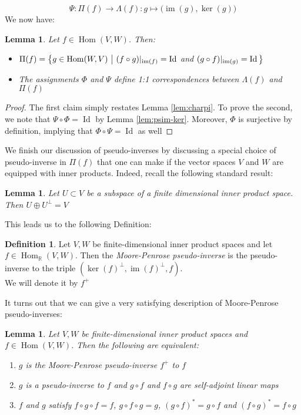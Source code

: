 \documentclass{book}
\theoremstyle{plain}
\newtheorem{lemma}[corollary]{Lemma}
\theoremstyle{definition}
\newtheorem{definition}[corollary]{Definition}
\renewcommand{\d}[1]{\mathbb{#1}}
\newcommand{\ds}{\oplus}
\newcommand{\fun}{\mapsto}
\DeclareMathOperator{\Hom}{Hom}
\DeclareMathOperator{\Id}{Id}
\DeclareMathOperator{\im}{im}
\newcommand{\mor}{\longrightarrow}
\begin{document}
\[
\Psi: \Pi(f)\mor \Lambda(f): g\fun \big(\im(g),\ker(g)\big)
\]
We now have:
\begin{lemma}\label{lem:psinverses}
	Let $f \in \Hom(V,W)$. Then:
	\begin{itemize}
		\item 
		$\Pi(f)=\big\{ g \in \Hom(W,V)\,\,\big\vert\,\, (f\circ g)\arrowvert_{\im(f)}=\Id$ \textrm{ and } $(g\circ f)\arrowvert_{\im(g)}=\Id \big\} $
		\item The assignments $\Phi$ and $\Psi$ define 1:1 correspondences between $\Lambda(f)$ and $\Pi(f)$
	\end{itemize}
\end{lemma}


\begin{proof}
	The first claim simply restates Lemma \ref{lem:charpi}. To prove the second, we note that $\Psi\circ \Phi=\Id$  by Lemma \ref{lem:psim-ker}. Moreover, $\Phi$ is surjective by definition, implying that $\Phi\circ \Psi =\Id$ as well
\end{proof}



\noindent We finish our discussion of pseudo-inverses by discussing a special choice of pseudo-inverse in $\Pi(f)$ that one can make if the vector spaces $V$ and $W$ are equipped with inner products. Indeed, recall the following standard result:

\begin{lemma}
 Let $U \subset V$ be a subspace of a finite dimensional inner product space. Then $U\ds U^{\perp}=V$
\end{lemma}

This leads us to the following Definition:
\begin{definition}\label{def:mpinverse}
Let $V,W$ be finite-dimensional inner product spaces and let $f \in \Hom_\d{R}(V,W)$. Then the \emph{Moore-Penrose pseudo-inverse} is the pseudo-inverse to the triple $(\ker(f)^\perp,\im(f)^\perp,f)$.\\ We will denote it by $f^+$
\end{definition}

\noindent It turns out that we can give a very satisfying description of Moore-Penrose pseudo-inverses:

\begin{lemma}\label{lem:mppschar}
	Let $V, W$ be finite-dimensional inner product spaces and $f \in \Hom(V,W)$. Then the following are equivalent:
	\begin{enumerate}
		\item $g$ is the Moore-Penrose pseudo-inverse $f^+$ to $f$
		\item $g$ is a pseudo-inverse to $f$ and $g\circ f$ and $f \circ g$ are self-adjoint linear maps
		\item $f$ and $g$ satisfy $f\circ g \circ f=f$, $g\circ f\circ g =g$,  $(g\circ f)^*=g\circ f$ and $(f\circ g)^* =f\circ g$
	\end{enumerate}
\end{lemma}
\end{document}
